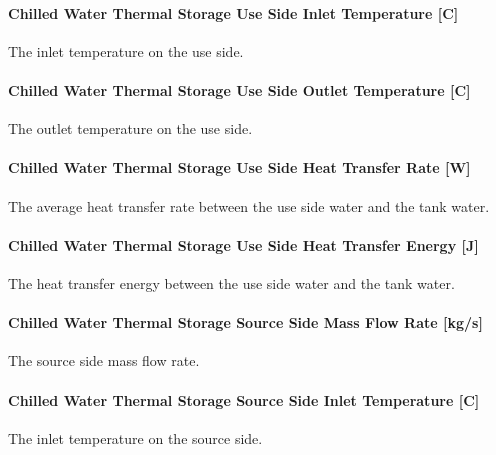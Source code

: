 \paragraph{Chilled Water Thermal Storage Use Side Inlet Temperature {[}C{]}}\label{chilled-water-thermal-storage-use-side-inlet-temperature-c-1}

The inlet temperature on the use side.

\paragraph{Chilled Water Thermal Storage Use Side Outlet Temperature {[}C{]}}\label{chilled-water-thermal-storage-use-side-outlet-temperature-c-1}

The outlet temperature on the use side.

\paragraph{Chilled Water Thermal Storage Use Side Heat Transfer Rate {[}W{]}}\label{chilled-water-thermal-storage-use-side-heat-transfer-rate-w-1}

The average heat transfer rate between the use side water and the tank water.

\paragraph{Chilled Water Thermal Storage Use Side Heat Transfer Energy {[}J{]}}\label{chilled-water-thermal-storage-use-side-heat-transfer-energy-j-1}

The heat transfer energy between the use side water and the tank water.

\paragraph{Chilled Water Thermal Storage Source Side Mass Flow Rate {[}kg/s{]}}\label{chilled-water-thermal-storage-source-side-mass-flow-rate-kgs-1}

The source side mass flow rate.

\paragraph{Chilled Water Thermal Storage Source Side Inlet Temperature {[}C{]}}\label{chilled-water-thermal-storage-source-side-inlet-temperature-c-1}

The inlet temperature on the source side.

